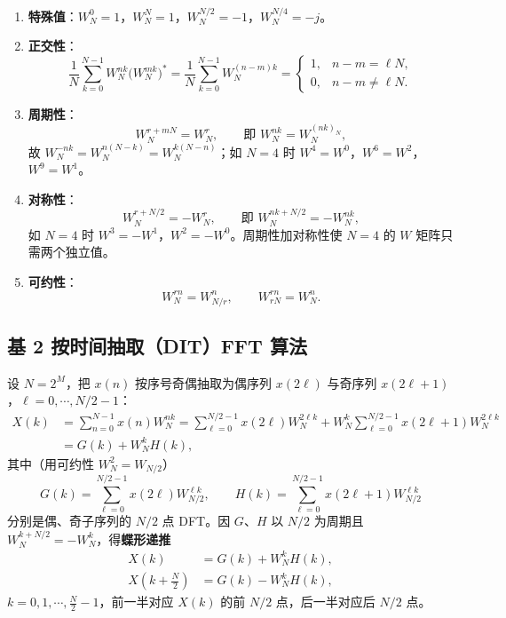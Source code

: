 \begin{enumerate}
\item \textbf{特殊值}：$W_N^0=1$，$W_N^N=1$，$W_N^{N/2}=-1$，$W_N^{N/4}=-j$。
\item \textbf{正交性}：
\begin{equation}
\frac{1}{N}\sum_{k=0}^{N-1}W_N^{nk}\big(W_N^{mk}\big)^*
=\frac{1}{N}\sum_{k=0}^{N-1}W_N^{(n-m)k}
=\begin{cases}1, & n-m=\ell N,\\ 0, & n-m\ne\ell N.\end{cases}
\end{equation}
\item \textbf{周期性}：
\begin{equation}
W_N^{r+mN}=W_N^{r},\qquad\text{即 } W_N^{nk}=W_N^{(nk)_N},
\end{equation}
故 $W_N^{-nk}=W_N^{n(N-k)}=W_N^{k(N-n)}$；如 $N=4$ 时 $W^4=W^0$，$W^6=W^2$，$W^9=W^1$。
\item \textbf{对称性}：
\begin{equation}
W_N^{r+N/2}=-W_N^{r},\qquad\text{即 } W_N^{nk+N/2}=-W_N^{nk},
\end{equation}
如 $N=4$ 时 $W^3=-W^1$，$W^2=-W^0$。周期性加对称性使 $N=4$ 的 $W$ 矩阵只需两个独立值。
\item \textbf{可约性}：
\begin{equation}
W_N^{rn}=W_{N/r}^{n},\qquad W_{rN}^{rn}=W_N^{n}.
\end{equation}
\end{enumerate}

\subsection{基 2 按时间抽取（DIT）FFT 算法}

设 $N=2^M$，把 $x(n)$ 按序号奇偶抽取为偶序列 $x(2\ell)$ 与奇序列 $x(2\ell+1)$，$\ell=0,\cdots,N/2-1$：
\begin{align}
X(k)&=\sum_{n=0}^{N-1}x(n)W_N^{nk}
=\sum_{\ell=0}^{N/2-1}x(2\ell)W_N^{2\ell k}
+W_N^{k}\sum_{\ell=0}^{N/2-1}x(2\ell+1)W_N^{2\ell k}\nonumber\\
&=G(k)+W_N^{k}H(k),
\end{align}
其中（用可约性 $W_N^2=W_{N/2}$）
\begin{equation}
G(k)=\sum_{\ell=0}^{N/2-1}x(2\ell)W_{N/2}^{\ell k},\qquad
H(k)=\sum_{\ell=0}^{N/2-1}x(2\ell+1)W_{N/2}^{\ell k}
\end{equation}
分别是偶、奇子序列的 $N/2$ 点 DFT。因 $G$、$H$ 以 $N/2$ 为周期且 $W_N^{k+N/2}=-W_N^{k}$，得\textbf{蝶形递推}
\begin{align}
X(k)&=G(k)+W_N^{k}H(k),\\
X\!\left(k+\frac{N}{2}\right)&=G(k)-W_N^{k}H(k),
\end{align}
$k=0,1,\cdots,\frac{N}{2}-1$，前一半对应 $X(k)$ 的前 $N/2$ 点，后一半对应后 $N/2$ 点。

